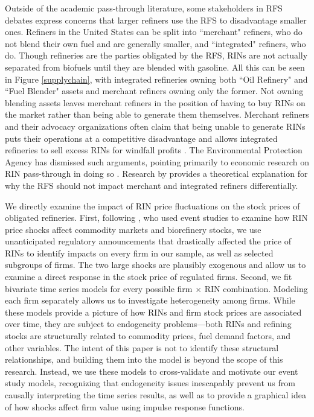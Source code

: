 \documentclass[11pt]{article}
\begin{document}
Outside of the academic pass-through literature, some stakeholders in RFS debates express concerns that larger refiners use the RFS to disadvantage smaller ones. Refiners in the United States can be split into ``merchant" refiners, who do not blend their own fuel and are generally smaller, and ``integrated" refiners, who do. Though refineries are the parties obligated by the RFS, RINs are not actually separated from biofuels until they are blended with gasoline. All this can be seen in Figure \ref{supplychain}, with integrated refineries owning both ``Oil Refinery" and ``Fuel Blender" assets and merchant refiners owning only the former. Not owning blending assets leaves merchant refiners in the position of having to buy RINs on the market rather than being able to generate them themselves. Merchant refiners and their advocacy organizations often claim that being unable to generate RINs puts their operations at a competitive disadvantage and allows integrated refineries to sell excess RINs for windfall profits \citep[see discussion and footnotes in][p. 21-31]{EnvironmentalProtectionAgency2017}. The Environmental Protection Agency has dismissed such arguments, pointing primarily to economic research on RIN pass-through in doing so \citep{EnvironmentalProtectionAgency2017}. Research by \cite{Babcock2016} provides a theoretical explanation for why the RFS should not impact merchant and integrated refiners differentially.

We directly examine the impact of RIN price fluctuations on the stock prices of obligated refineries. First, following \cite{Lade2018a}, who used event studies to examine how RIN price shocks affect commodity markets and biorefinery stocks, we use unanticipated regulatory announcements that drastically affected the price of RINs to identify impacts on every firm in our sample, as well as selected subgroups of firms. The two large shocks are plausibly exogenous and allow us to examine a direct response in the stock price of regulated firms. Second, we fit bivariate time series models for every possible firm $\times$ RIN combination. Modeling each firm separately allows us to investigate heterogeneity among firms. While these models provide a picture of how RINs and firm stock prices are associated over time, they are subject to endogeneity problems---both RINs and refining stocks are structurally related to commodity prices, fuel demand factors, and other variables. The intent of this paper is not to identify these structural relationships, and building them into the model is beyond the scope of this research. Instead, we use these models to cross-validate and motivate our event study models, recognizing that endogeneity issues inescapably prevent us from causally interpreting the time series results, as well as to provide a graphical idea of how shocks affect firm value using impulse response functions.
\end{document}
